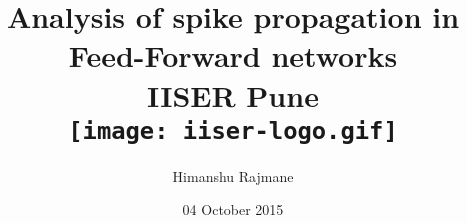 \documentclass[12pt]{report}
\begin{document}
\title{
	{Analysis of spike propagation in Feed-Forward networks}\\
	{\large IISER Pune}\\
	{\texttt{[image: iiser-logo.gif]}}
}
\author{Himanshu Rajmane}
\date{04 October 2015}
\maketitle
\end{document}
